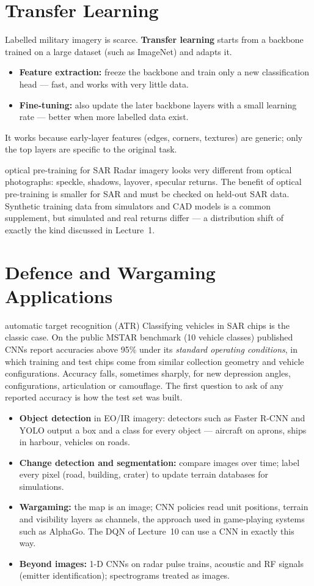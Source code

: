\documentclass[11pt]{article}
\begin{document}
\section{Transfer Learning}
Labelled military imagery is scarce. \textbf{Transfer learning} starts from a backbone trained on a large dataset (such as ImageNet) and adapts it.
\begin{itemize}
\item \textbf{Feature extraction:} freeze the backbone and train only a new classification head --- fast, and works with very little data.
\item \textbf{Fine-tuning:} also update the later backbone layers with a small learning rate --- better when more labelled data exist.
\end{itemize}
It works because early-layer features (edges, corners, textures) are generic; only the top layers are specific to the original task.
\begin{pitfall}{optical pre-training for SAR}
Radar imagery looks very different from optical photographs: speckle, shadows, layover, specular returns. The benefit of optical pre-training is smaller for SAR and must be checked on held-out SAR data. Synthetic training data from simulators and CAD models is a common supplement, but simulated and real returns differ --- a distribution shift of exactly the kind discussed in Lecture~1.
\end{pitfall}

\section{Defence and Wargaming Applications}
\begin{defence}{automatic target recognition (ATR)}
Classifying vehicles in SAR chips is the classic case. On the public MSTAR benchmark (10 vehicle classes) published CNNs report accuracies above 95\% under its \emph{standard operating conditions}, in which training and test chips come from similar collection geometry and vehicle configurations. Accuracy falls, sometimes sharply, for new depression angles, configurations, articulation or camouflage. The first question to ask of any reported accuracy is how the test set was built.
\end{defence}
\begin{itemize}
\item \textbf{Object detection} in EO/IR imagery: detectors such as Faster R-CNN and YOLO output a box and a class for every object --- aircraft on aprons, ships in harbour, vehicles on roads.
\item \textbf{Change detection and segmentation:} compare images over time; label every pixel (road, building, crater) to update terrain databases for simulations.
\item \textbf{Wargaming:} the map is an image; CNN policies read unit positions, terrain and visibility layers as channels, the approach used in game-playing systems such as AlphaGo. The DQN of Lecture~10 can use a CNN in exactly this way.
\item \textbf{Beyond images:} 1-D CNNs on radar pulse trains, acoustic and RF signals (emitter identification); spectrograms treated as images.
\end{itemize}
\end{document}
